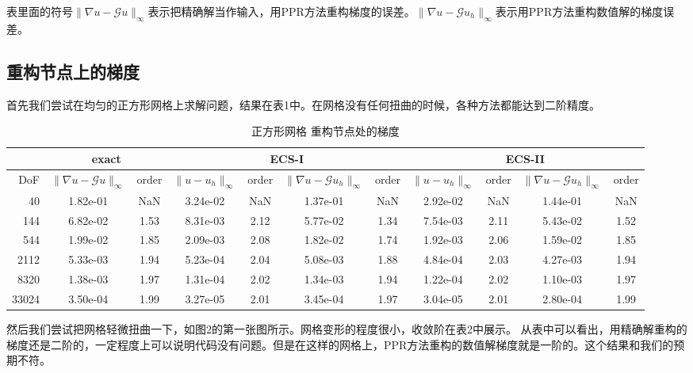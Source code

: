 \documentclass[12pt,a4paper]{article}
\theoremstyle{plain}
\begin{document}
表里面的符号$\|\nabla u - \mathcal{G} u\|_\infty$表示把精确解当作输入，用PPR方法重构梯度的误差。$\|\nabla u - \mathcal{G} u_h\|_\infty$表示用PPR方法重构数值解的梯度误差。

\newpage
\subsection*{重构节点上的梯度}

首先我们尝试在均匀的正方形网格上求解问题，结果在表1中。在网格没有任何扭曲的时候，各种方法都能达到二阶精度。

\begin{table}[h]
\centering
\scriptsize
\begin{tabular}{r|cc|cc|cc|cc|cc}
\hline
& \multicolumn{2}{c|}{exact} & \multicolumn{4}{c}{ECS-I} & \multicolumn{4}{|c}{ECS-II} \\
\hline
DoF & $\|\nabla u - \mathcal{G} u\|_\infty$ & order & $\|u - u_h\|_\infty$ & order & $\|\nabla u - \mathcal{G} u_h\|_\infty$ & order & $\|u - u_h\|_\infty$ & order & $\|\nabla u - \mathcal{G} u_h\|_\infty$ & order \\
\hline
40 & 1.82e-01 & NaN & 3.24e-02 & NaN & 1.37e-01 & NaN & 2.92e-02 & NaN & 1.44e-01 & NaN \\
144 & 6.82e-02 & 1.53 & 8.31e-03 & 2.12 & 5.77e-02 & 1.34 & 7.54e-03 & 2.11 & 5.43e-02 & 1.52 \\
544 & 1.99e-02 & 1.85 & 2.09e-03 & 2.08 & 1.82e-02 & 1.74 & 1.92e-03 & 2.06 & 1.59e-02 & 1.85 \\
2112 & 5.33e-03 & 1.94 & 5.23e-04 & 2.04 & 5.08e-03 & 1.88 & 4.84e-04 & 2.03 & 4.27e-03 & 1.94 \\
8320 & 1.38e-03 & 1.97 & 1.31e-04 & 2.02 & 1.34e-03 & 1.94 & 1.22e-04 & 2.02 & 1.10e-03 & 1.97 \\
33024 & 3.50e-04 & 1.99 & 3.27e-05 & 2.01 & 3.45e-04 & 1.97 & 3.04e-05 & 2.01 & 2.80e-04 & 1.99 \\
\hline
\end{tabular}
\caption{正方形网格 重构节点处的梯度}
\end{table}

然后我们尝试把网格轻微扭曲一下，如图2的第一张图所示。网格变形的程度很小，收敛阶在表2中展示。
从表中可以看出，用精确解重构的梯度还是二阶的，一定程度上可以说明代码没有问题。但是在这样的网格上，PPR方法重构的数值解梯度就是一阶的。这个结果和我们的预期不符。
\end{document}
